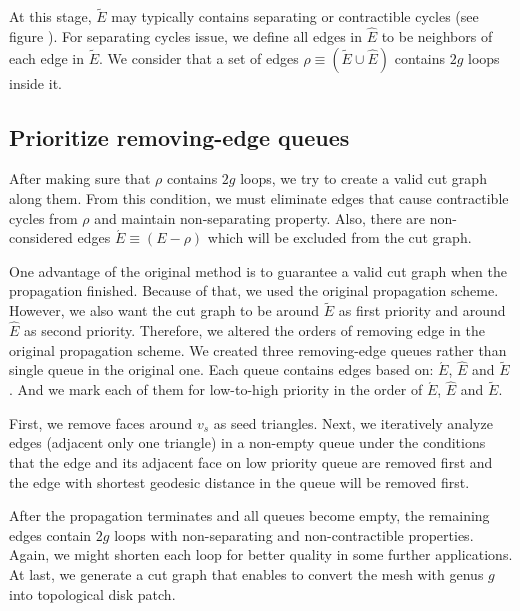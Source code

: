 \documentclass[a4paper,twoside]{article}
\begin{document}
At this stage, $\tilde{E}$ may typically contains separating or contractible cycles (see figure ).  For separating cycles issue, we define all edges in $\hat{E}$ to be neighbors of each edge in $\tilde{E}$. We consider that a set of edges $\rho \equiv (\tilde{E} \cup \hat{E})$ contains $2g$ loops inside it.  

\subsection{Prioritize removing-edge queues}
After making sure that $\rho$ contains $2g$ loops, we try to create a valid cut graph along them. From this condition, we must eliminate edges that cause contractible cycles from $\rho$ and maintain non-separating property. Also, there are non-considered edges $\acute{E} \equiv (E - \rho)$ which will be excluded from the cut graph.

One advantage of the original method is to guarantee a valid cut graph when the propagation finished. Because of that, we used the original propagation scheme. However, we also want the cut graph to be around $\tilde{E}$ as first priority and around $\hat{E}$ as second priority. Therefore, we altered the orders of removing edge in the original propagation scheme. We created three removing-edge queues rather than single queue in the original one. Each queue contains edges based on: 
$\acute{E}$, $\hat{E}$ and $\tilde{E}$.  And we mark each of them for low-to-high priority in the order of $\acute{E}$, $\hat{E}$ and $\tilde{E}$.

First, we remove faces around $v_s$ as seed triangles. Next, we iteratively analyze edges (adjacent only one triangle) in a non-empty queue under the conditions that the edge and its adjacent face on low priority queue are removed first and the edge with shortest geodesic distance in the queue will be removed first.

After the propagation terminates and all queues become empty, the remaining edges contain $2g$ loops with non-separating and non-contractible properties. Again, we might shorten each loop for better quality in some further applications. At last, we generate a cut graph that enables to convert the mesh with genus $g$ into topological disk patch.
\end{document}
